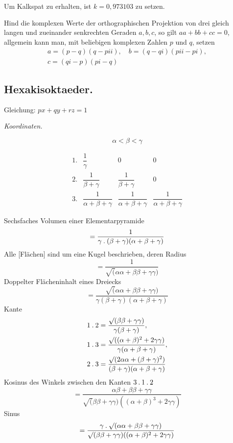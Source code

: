 Um Kalkspat zu erhalten, ist $k=0{,}973103$ zu setzen.

Hind die komplexen Werte der orthographischen Projektion von drei gleich langen und zueinander senkrechten Geraden $a,b,c$, so gilt $aa+bb+cc=0$, allgemein kann man, mit beliebigen komplexen Zahlen $p$ und $q$, setzen
\[
\begin{gathered}
a=(p-q)(q-pii),\quad b=(q-qi)(pii-pi),\\c=(qi-p)(pi-q)
\end{gathered}
\]

\clearpage
{}
\subsection*{Hexakisoktaeder.}
\begin{center}
\resizebox{!}{14mm}{}\qquad Gleichung: $px+qy+rz=1$
\end{center}

\begin{center}\emph{Koordinaten.}\end{center}
\begin{center}
\begin{minipage}{.28\textwidth}\centering
\resizebox{\linewidth}{!}{}
\[\alpha<\beta<\gamma\]
\end{minipage}\hfill
\begin{minipage}{.68\textwidth}
\[
\begin{array}{rccc}
1.&\dfrac1\gamma&0&0\\[1ex]
2.&\dfrac1{\beta+\gamma}&\dfrac1{\beta+\gamma}&0\\[1ex]
3.&\dfrac1{\alpha+\beta+\gamma}&\dfrac1{\alpha+\beta+\gamma}&\dfrac1{\alpha+\beta+\gamma}
\end{array}
\]
\end{minipage}
\end{center}

Sechsfaches Volumen einer Elementarpyramide
\[
=\frac1{\gamma\mathbin{.}(\beta+\gamma)(\alpha+\beta+\gamma)}
\]
Alle [Flächen] sind um eine Kugel beschrieben, deren Radius
\[
=\frac1{\surd(\alpha\alpha+\beta\beta+\gamma\gamma)}
\]
Doppelter Flächeninhalt eines Dreiecks
\[
=\frac{\surd(\alpha\alpha+\beta\beta+\gamma\gamma)}{\gamma(\beta+\gamma)(\alpha+\beta+\gamma)}
\]
Kante
\[
\begin{aligned}
1\mathbin{.}2&=\frac{\surd(\beta\beta+\gamma\gamma)}{\gamma(\beta+\gamma)},\\
1\mathbin{.}3&=\frac{\surd((\alpha+\beta)^2+2\gamma\gamma)}{\gamma(\alpha+\beta+\gamma)},\\
2\mathbin{.}3&=\frac{\surd(2\alpha\alpha+(\beta+\gamma)^2)}{(\beta+\gamma)(\alpha+\beta+\gamma)}
\end{aligned}
\]
Kosinus des Winkels zwischen den Kanten $3\mathbin{.}1\mathbin{.}2$
\[
=\frac{\alpha\beta+\beta\beta+\gamma\gamma}{\surd(\beta\beta+\gamma\gamma)((\alpha+\beta)^3+2\gamma\gamma)}
\]
Sinus
\[
=\frac{\gamma\mathbin{.}\surd(\alpha\alpha+\beta\beta+\gamma\gamma)}{\surd(\beta\beta+\gamma\gamma)((\alpha+\beta)^2+2\gamma\gamma)}
\]

